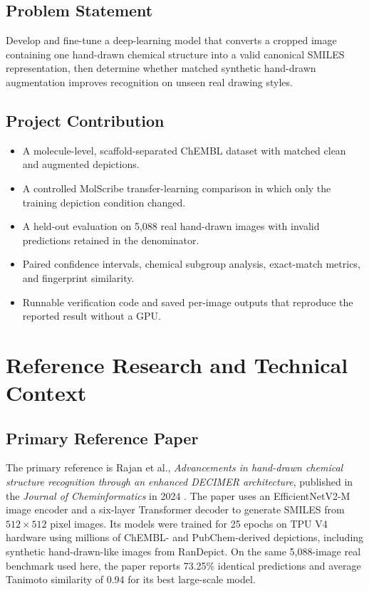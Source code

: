\documentclass[11pt,a4paper]{article}
\begin{document}
\subsection*{Problem Statement}

Develop and fine-tune a deep-learning model that converts a cropped image containing one
hand-drawn chemical structure into a valid canonical SMILES representation, then determine
whether matched synthetic hand-drawn augmentation improves recognition on unseen real
drawing styles.

\subsection*{Project Contribution}

\begin{itemize}
  \item A molecule-level, scaffold-separated ChEMBL dataset with matched clean and augmented depictions.
  \item A controlled MolScribe transfer-learning comparison in which only the training depiction condition changed.
  \item A held-out evaluation on 5,088 real hand-drawn images with invalid predictions retained in the denominator.
  \item Paired confidence intervals, chemical subgroup analysis, exact-match metrics, and fingerprint similarity.
  \item Runnable verification code and saved per-image outputs that reproduce the reported result without a GPU.
\end{itemize}

\section*{Reference Research and Technical Context}

\subsection*{Primary Reference Paper}

The primary reference is Rajan et al., \emph{Advancements in hand-drawn chemical structure
recognition through an enhanced DECIMER architecture}, published in the \emph{Journal of
Cheminformatics} in 2024 \cite{rajan2024}. The paper uses an EfficientNetV2-M image encoder
and a six-layer Transformer decoder to generate SMILES from $512\times512$ pixel images.
Its models were trained for 25 epochs on TPU V4 hardware using millions of ChEMBL- and
PubChem-derived depictions, including synthetic hand-drawn-like images from RanDepict. On
the same 5,088-image real benchmark used here, the paper reports 73.25\% identical predictions
and average Tanimoto similarity of 0.94 for its best large-scale model.
\end{document}

